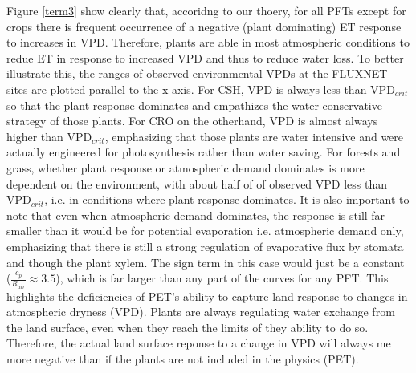 \documentclass[draft,linenumbers]{agujournal}
\begin{document}
Figure \ref{term3} show clearly that, accoridng to our thoery, for all PFTs except for crops there is frequent occurrence of a negative (plant dominating) ET response to increases in VPD. Therefore, plants are able in most atmospheric conditions to redue ET in response to increased VPD and thus to reduce water loss. To better illustrate this, the ranges of observed environmental VPDs at the FLUXNET sites are plotted parallel to the x-axis. For CSH, VPD is always less than VPD$_{crit}$ so that the plant response dominates and empathizes the water conservative strategy of those plants. For CRO on the otherhand, VPD is almost always higher than VPD$_{crit}$, emphasizing that those plants are water intensive and were actually engineered for photosynthesis rather than water saving. For forests and grass, whether plant response or atmospheric demand dominates is more dependent on the environment, with about half of of observed VPD less than VPD$_{crit}$, i.e. in conditions where plant response dominates. It is also important to note that even when atmospheric demand dominates, the response is still far smaller than it would be for potential evaporation i.e. atmospheric demand only, emphasizing that there is still a strong regulation of evaporative flux by stomata and though the plant xylem. The sign term in this case would just be a constant ($\frac{c_p}{R_{air}} \approx 3.5$), which is far larger than any part of the curves for any PFT. This highlights the deficiencies of PET's ability to capture land response to changes in atmospheric dryness (VPD). Plants are always regulating water exchange from the land surface, even when they reach the limits of they ability to do so. Therefore, the actual land surface reponse to a change in VPD will always me more negative than if the plants are not included in the physics (PET). 
\end{document}

